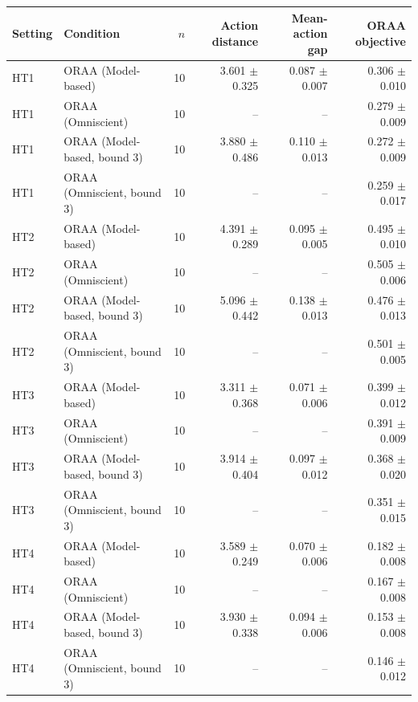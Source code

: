 \begin{tabular}{llrrrr}
\toprule
Setting & Condition & $n$ & Action distance & Mean-action gap & ORAA objective \\
\midrule
HT1 & ORAA (Model-based) & 10 & 3.601 $\pm$ 0.325 & 0.087 $\pm$ 0.007 & 0.306 $\pm$ 0.010 \\
HT1 & ORAA (Omniscient) & 10 & -- & -- & 0.279 $\pm$ 0.009 \\
HT1 & ORAA (Model-based, bound 3) & 10 & 3.880 $\pm$ 0.486 & 0.110 $\pm$ 0.013 & 0.272 $\pm$ 0.009 \\
HT1 & ORAA (Omniscient, bound 3) & 10 & -- & -- & 0.259 $\pm$ 0.017 \\
HT2 & ORAA (Model-based) & 10 & 4.391 $\pm$ 0.289 & 0.095 $\pm$ 0.005 & 0.495 $\pm$ 0.010 \\
HT2 & ORAA (Omniscient) & 10 & -- & -- & 0.505 $\pm$ 0.006 \\
HT2 & ORAA (Model-based, bound 3) & 10 & 5.096 $\pm$ 0.442 & 0.138 $\pm$ 0.013 & 0.476 $\pm$ 0.013 \\
HT2 & ORAA (Omniscient, bound 3) & 10 & -- & -- & 0.501 $\pm$ 0.005 \\
HT3 & ORAA (Model-based) & 10 & 3.311 $\pm$ 0.368 & 0.071 $\pm$ 0.006 & 0.399 $\pm$ 0.012 \\
HT3 & ORAA (Omniscient) & 10 & -- & -- & 0.391 $\pm$ 0.009 \\
HT3 & ORAA (Model-based, bound 3) & 10 & 3.914 $\pm$ 0.404 & 0.097 $\pm$ 0.012 & 0.368 $\pm$ 0.020 \\
HT3 & ORAA (Omniscient, bound 3) & 10 & -- & -- & 0.351 $\pm$ 0.015 \\
HT4 & ORAA (Model-based) & 10 & 3.589 $\pm$ 0.249 & 0.070 $\pm$ 0.006 & 0.182 $\pm$ 0.008 \\
HT4 & ORAA (Omniscient) & 10 & -- & -- & 0.167 $\pm$ 0.008 \\
HT4 & ORAA (Model-based, bound 3) & 10 & 3.930 $\pm$ 0.338 & 0.094 $\pm$ 0.006 & 0.153 $\pm$ 0.008 \\
HT4 & ORAA (Omniscient, bound 3) & 10 & -- & -- & 0.146 $\pm$ 0.012 \\
\bottomrule
\end{tabular}
